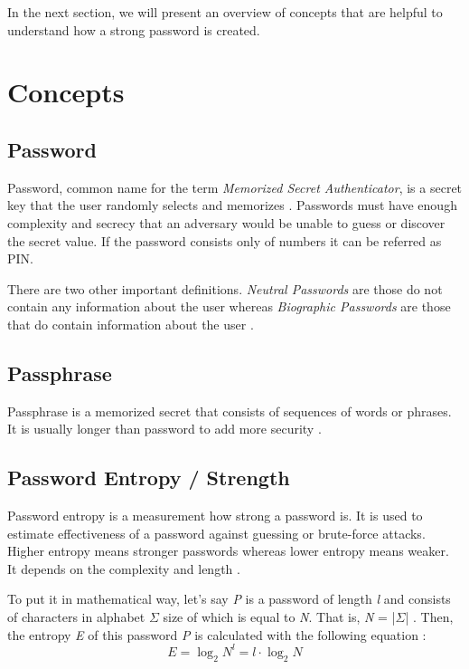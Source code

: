 \documentclass[acmsmall,nonacm]{acmart}
\begin{document}
In the next section, we will present an overview of concepts that are helpful to understand how a strong password is created.

\section{Concepts}

\subsection{Password} \label{password}

Password, common name for the term \emph{Memorized Secret Authenticator}, is a secret key that the user randomly selects and memorizes \cite{nist_2020}. Passwords must have enough complexity and secrecy that an adversary would be unable to guess or discover the secret value. If the password consists only of numbers it can be referred as PIN.

There are two other important definitions. \emph{Neutral Passwords} are those do not contain any information about the user whereas \emph{Biographic Passwords} are those that do contain information about the user \cite{Kavrestad_2019}.

\subsection{Passphrase} \label{passphrase}

Passphrase is a memorized secret that consists of sequences of words or phrases. It is usually longer than password to add more security \cite{passphrase_def}.

\subsection{Password Entropy / Strength} \label{entropy}
Password entropy is a measurement how strong a password is. It is used to estimate effectiveness of a password against guessing or brute-force attacks. Higher entropy means stronger passwords whereas lower entropy means weaker. It depends on the complexity and length \cite{hu_2018}.

To put it in mathematical way, let's say \emph{P} is a password of length \emph{l} and consists of characters in alphabet $\Sigma$ size of which is equal to \emph{N}. That is, \emph{N} = |$\Sigma$| . Then, the entropy \emph{E} of this password \emph{P} is calculated with the following equation :
\begin{equation} \label{eq:1}
E = \log_2 N^l = l \cdot \log_2 N
\end{equation}
\end{document}
